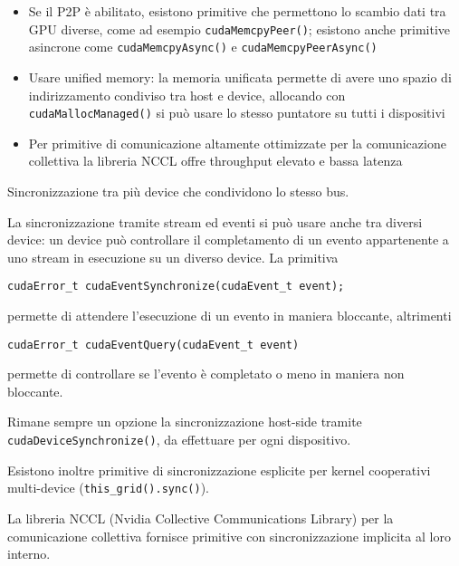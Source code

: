 \begin{questions}
\begin{solution}
\begin{itemize}
            \item Se il P2P è abilitato, esistono primitive che permettono lo scambio dati tra GPU diverse, come ad esempio \texttt{cudaMemcpyPeer()}; esistono anche primitive asincrone come \texttt{cudaMemcpyAsync()} e \texttt{cudaMemcpyPeerAsync()}
            
            \item Usare unified memory: la memoria unificata permette di avere uno spazio di indirizzamento condiviso tra host e device, allocando con \texttt{cudaMallocManaged()} si può usare lo stesso puntatore su tutti i dispositivi
            
            \item Per primitive di comunicazione altamente ottimizzate per la comunicazione collettiva la libreria NCCL offre throughput elevato e bassa latenza
        \end{itemize}
    \end{solution}
    
    \question Sincronizzazione tra più device che condividono lo stesso bus.
    
    \begin{solution}
        La sincronizzazione tramite stream ed eventi si può usare anche tra diversi device: un device può controllare il completamento di un evento appartenente a uno stream in esecuzione su un diverso device. La primitiva
        \begin{verbatim}
cudaError_t cudaEventSynchronize(cudaEvent_t event);
        \end{verbatim}
        permette di attendere l'esecuzione di un evento in maniera bloccante, altrimenti
        \begin{verbatim}
cudaError_t cudaEventQuery(cudaEvent_t event)
        \end{verbatim}
        permette di controllare se l'evento è completato o meno in maniera non bloccante.
        
        Rimane sempre un opzione la sincronizzazione host-side tramite \texttt{cudaDeviceSynchronize()}, da effettuare per ogni dispositivo.
        
        Esistono inoltre primitive di sincronizzazione esplicite per kernel cooperativi multi-device (\texttt{this\_grid().sync()}).
        
        La libreria NCCL (Nvidia Collective Communications Library) per la comunicazione collettiva fornisce primitive con sincronizzazione implicita al loro interno.
    \end{solution}
    

\end{questions}
